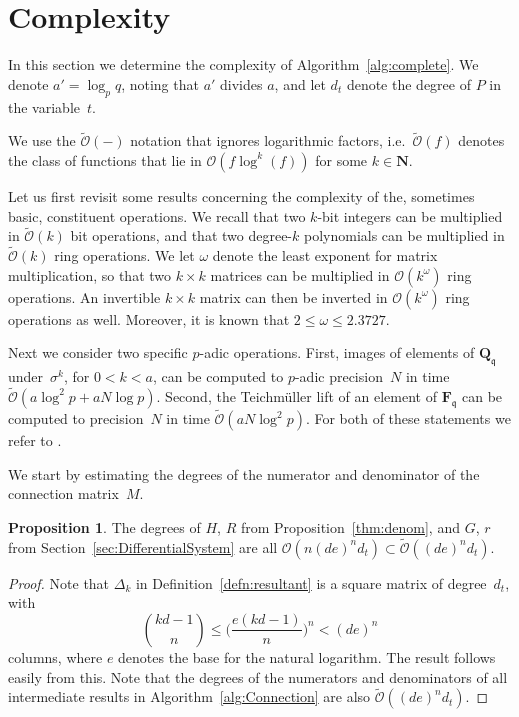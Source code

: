 \documentclass[a4paper,11pt]{article}
\numberwithin{equation}{section}
\newcommand{\NN}{\mathbf{N}} %
\newcommand{\QQ}{\mathbf{Q}} %
\newcommand{\FF}{\mathbf{F}} %
\providecommand{\BigOh}{\mathcal{O}}          %
\providecommand{\SoftOh}{\tilde{\mathcal{O}}} %
\theoremstyle{definition}
\newtheorem{prop}[thm]{Proposition}
\begin{document}
\section{Complexity}

In this section we determine the complexity of Algorithm~\ref{alg:complete}.
We denote $a' = \log_p q$, noting that $a'$ divides $a$, 
and let $d_t$ denote the degree of $P$ in the variable~$t$. 

We use the $\SoftOh(-)$ notation that ignores logarithmic factors, 
i.e.\ $\SoftOh(f)$ denotes the class of functions 
that lie in $\BigOh(f \log^k(f))$ for some $k \in \NN$.

Let us first revisit some results concerning the complexity of the, 
sometimes basic, constituent operations.  We recall that two $k$-bit 
integers can be multiplied in $\SoftOh(k)$ bit operations, and that 
two degree-$k$ polynomials can be multiplied in $\SoftOh(k)$ ring 
operations.  We let $\omega$ denote the least exponent for matrix 
multiplication, so that two $k \times k$ matrices can be multiplied 
in $\BigOh(k^{\omega})$ ring operations. An invertible 
$k \times k$ matrix can then be inverted in $\BigOh(k^{\omega})$ 
ring operations as well. Moreover, it is known that $2 \leq \omega \leq 2.3727$. 

Next we consider two specific $p$-adic operations.  First, images of elements of 
$\QQ_{\mathfrak{q}}$ under~$\sigma^k$, for $0 < k < a$, can be computed to 
$p$-adic precision~$N$ in time $\SoftOh(a \log^2 p + a N \log p)$. 
Second, the Teichm\"uller lift of an element of $\FF_{\mathfrak{q}}$ can be 
computed to precision~$N$ in time $\SoftOh(a N \log^2 p)$. For both of these
statements we refer to \cite{Hubrechts2010}.

We start by estimating the degrees of the numerator and denominator of the
connection matrix~$M$.

\begin{prop}
The degrees of $H$, $R$ from Proposition~\ref{thm:denom}, and
$G$, $r$ from Section~\ref{sec:DifferentialSystem} are all
$\BigOh(n(de)^n d_t) \subset \SoftOh((de)^n d_t)$.
\end{prop}

\begin{proof}
Note that $\Delta_k$ in Definition~\ref{defn:resultant} is a square matrix 
of degree~$d_t$, with
\[
{kd-1 \choose n} \leq \biggl( \frac{e(kd-1)}{n} \biggr)^n < (de)^n
\]
columns, where $e$ denotes the base for the natural logarithm. The result 
follows easily from this. Note that the degrees of the numerators and 
denominators of all intermediate results in Algorithm~\ref{alg:Connection} 
are also $\SoftOh((de)^n d_t)$.
\end{proof}
\end{document}
